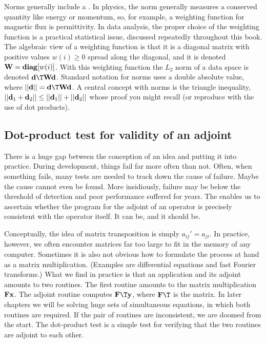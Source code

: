 \par
Norms generally include a .
In physics,
the norm generally measures a conserved quantity
like energy or momentum,
so, for example,
a weighting function for magnetic flux is permittivity.
In data analysis,
the proper choice of the weighting function is
a practical statistical issue,
discussed repeatedly throughout this book.
The algebraic view of a weighting function is that
it is a diagonal matrix
with positive values $w(i)\ge 0$ spread along the diagonal,
and it is denoted $\bold W = {\bf diag}[w(i)]$.
With this weighting function
the $L_2$ norm of a data space is denoted
$\bold d\T \bold W \bold d$.
Standard notation for norms uses a double absolute value,
where $||\bold d||=\bold d\T \bold W \bold d$.
A central concept with norms is the triangle inequality,
$ ||\bold d_1   +   \bold d_2|| \le ||\bold d_1|| + ||\bold d_2|| $
whose proof you might recall (or reproduce with the use of dot products).

\subsection{Dot-product test for validity of an adjoint}
\par
There is a huge gap between the
conception of an idea and putting it into practice.
During development, things fail far more often than not.
Often, when something fails,
many tests are needed to track down the cause of failure.
Maybe the cause cannot even be found.
More insidiously, failure may be below the threshold of detection
and poor performance suffered for years.
The 
enables us to ascertain whether
the program for the adjoint of an operator
is precisely consistent with the operator itself.
It can be, and it should be.

\par
Conceptually, the idea of matrix transposition is simply ${a}_{ij}'=a_{ji}$.
In practice, however, we often encounter matrices far too large
to fit in the memory of any computer.
Sometimes it is also not obvious how to formulate the process at hand
as a matrix multiplication.
(Examples are differential equations and fast Fourier transforms.)
What we find in practice is that an application and its adjoint 
amounts to two routines. The first routine
amounts to the matrix multiplication $ \bold F \bold x$.
The adjoint routine computes $\bold F\T \bold y$,
where $\bold F\T$ is the  matrix.
In later chapters we will be solving huge sets of simultaneous equations,
in which both routines are required.
If the pair of routines are inconsistent,
we are doomed from the start.
The dot-product test is a simple test for verifying that the two 
routines are adjoint to each other.

